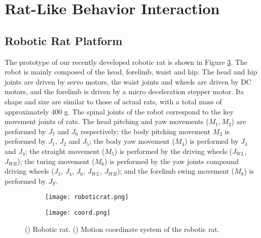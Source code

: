 \section{Rat-Like Behavior Interaction}
\subsection{Robotic Rat Platform}
The prototype of our recently developed robotic rat is shown in Figure
\ref{figure:robot-system}. The robot is mainly composed of the head, forelimb,
waist and hip. The head and hip joints are driven by servo motors, the waist
joints and wheels are driven by DC motors, and the forelimb is driven by a micro
deceleration stepper motor. Its shape and size are similar to those of actual
rats, with a total mass of approximately 400 g. The spinal joints of the robot
correspond to the key movement joints of rats. The head pitching and yaw
movements ($M_1, M_2$) are performed by $J_7$ and $J_6$ respectively; the body
pitching movement $M_3$ is performed by $J_1$, $J_2$ and $J_5$; the body yaw
movement ($M_4$) is performed by $J_3$ and $J_4$; the straight movement ($M_5$)
is performed by the driving wheels ($J_{WL}$, $J_{WR}$); the turing movement
($M_6$) is performed by the yaw joints compound driving wheels ($J_3$, $J_4$,
$J_6$, $J_{WL}$, $J_{WR}$); and the forelimb swing movement ($M_8$) is performed
by $J_F$.

\begin{figure}[h]
    \centering
    \begin{subfigure}{0.4\textwidth}
        \texttt{[image: roboticrat.png]}
        \caption{\label{figure:roboticrat}}
    \end{subfigure}
    \begin{subfigure}{0.5\textwidth}
        \texttt{[image: coord.png]}
        \caption{\label{figure:motion-coord}}
    \end{subfigure}
    \caption{() Robotic rat. () Motion coordinate system of the robotic rat.}
    \label{figure:robot-system}
\end{figure}

